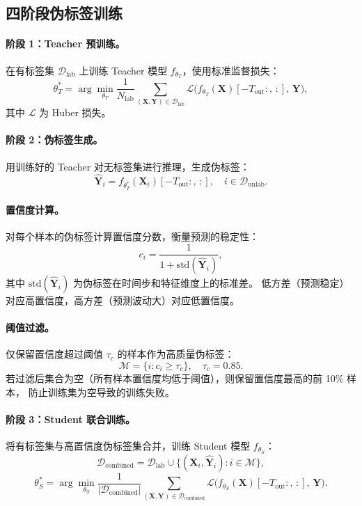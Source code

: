 \documentclass[11pt,a4paper]{article}
\newcommand{\mat}[1]{\bm{#1}}
\begin{document}
\subsection{四阶段伪标签训练}

\paragraph{阶段 1：Teacher 预训练。}
在有标签集 $\mathcal{D}_{\text{lab}}$ 上训练 Teacher 模型 $f_{\theta_T}$，使用标准监督损失：
\[
\theta_T^* = \arg\min_{\theta_T} \frac{1}{N_{\text{lab}}} \sum_{(\mat{X}, \mat{Y}) \in \mathcal{D}_{\text{lab}}} \mathcal{L}\bigl(f_{\theta_T}(\mat{X})[-T_{\text{out}}:,\, :],\, \mat{Y}\bigr),
\]
其中 $\mathcal{L}$ 为 Huber 损失。

\paragraph{阶段 2：伪标签生成。}
用训练好的 Teacher 对无标签集进行推理，生成伪标签：
\[
\widehat{\mat{Y}}_i = f_{\theta_T^*}(\mat{X}_i)[-T_{\text{out}}:,\, :], \quad i \in \mathcal{D}_{\text{unlab}}.
\]

\paragraph{置信度计算。}
对每个样本的伪标签计算置信度分数，衡量预测的稳定性：
\begin{equation}\label{eq:confidence}
c_i = \frac{1}{1 + \mathrm{std}(\widehat{\mat{Y}}_i)},
\end{equation}
其中 $\mathrm{std}(\widehat{\mat{Y}}_i)$ 为伪标签在时间步和特征维度上的标准差。
低方差（预测稳定）对应高置信度，高方差（预测波动大）对应低置信度。

\paragraph{阈值过滤。}
仅保留置信度超过阈值 $\tau_c$ 的样本作为高质量伪标签：
\[
\mathcal{M} = \{i : c_i \ge \tau_c\}, \quad \tau_c = 0.85.
\]
若过滤后集合为空（所有样本置信度均低于阈值），则保留置信度最高的前 10\% 样本，
防止训练集为空导致的训练失败。

\paragraph{阶段 3：Student 联合训练。}
将有标签集与高置信度伪标签集合并，训练 Student 模型 $f_{\theta_S}$：
\[
\mathcal{D}_{\text{combined}} = \mathcal{D}_{\text{lab}} \cup \{(\mat{X}_i, \widehat{\mat{Y}}_i) : i \in \mathcal{M}\},
\]
\[
\theta_S^* = \arg\min_{\theta_S} \frac{1}{|\mathcal{D}_{\text{combined}}|} \sum_{(\mat{X}, \mat{Y}) \in \mathcal{D}_{\text{combined}}} \mathcal{L}\bigl(f_{\theta_S}(\mat{X})[-T_{\text{out}}:,\, :],\, \mat{Y}\bigr).
\]
\end{document}
